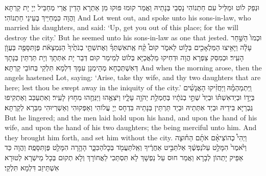 {וּנְפַק לוֹט וּמַלֵּיל עִם חַתְנוֹהִי נָסְבֵי בְּנָתֵיהּ וַאֲמַר קוּמוּ פּוּקוּ מִן אַתְרָא הָדֵין אֲרֵי מְחַבֵּיל יְיָ יָת קַרְתָּא וַהֲוָה כִּמְחַיֵּיךְ בְּעֵינֵי חַתְנוֹהִי׃}
{And Lot went out, and spoke unto his sons-in-law, who married his daughters, and said: ‘Up, get you out of this place; for the \lord\space will destroy the city.’ But he seemed unto his sons-in-law as one that jested.}{}
{וּכְמוֹ֙ הַשַּׁ֣חַר עָלָ֔ה וַיָּאִ֥יצוּ הַמַּלְאָכִ֖ים בְּל֣וֹט לֵאמֹ֑ר קוּם֩ קַ֨ח אֶֽת\maqqaf אִשְׁתְּךָ֜ וְאֶת\maqqaf שְׁתֵּ֤י בְנֹתֶ֙יךָ֙ הַנִּמְצָאֹ֔ת פֶּן\maqqaf תִּסָּפֶ֖ה בַּעֲוֺ֥ן הָעִֽיר׃}
{וּכְמִסַּק צַפְרָא הֲוָה וּדְחִיקוּ מַלְאֲכַיָּא בְּלוֹט לְמֵימַר קוּם דְּבַר יָת אִתְּתָךְ וְיָת תַּרְתֵּין בְּנָתָךְ דְּאִשְׁתְּכַחָא מְהֵימְנָן עִמָּךְ דִּלְמָא תִּלְקֵי בְּחוֹבֵי קַרְתָּא׃}
{And when the morning arose, then the angels hastened Lot, saying: ‘Arise, take thy wife, and thy two daughters that are here; lest thou be swept away in the iniquity of the city.’}{}
{וַֽיִּתְמַהְמָ֓הּ \legarmeh  וַיַּחֲזִ֨יקוּ הָאֲנָשִׁ֜ים בְּיָד֣וֹ וּבְיַד\maqqaf אִשְׁתּ֗וֹ וּבְיַד֙ שְׁתֵּ֣י בְנֹתָ֔יו בְּחֶמְלַ֥ת יְהֹוָ֖ה עָלָ֑יו וַיֹּצִאֻ֥הוּ וַיַּנִּחֻ֖הוּ מִח֥וּץ לָעִֽיר׃}
{וְאִתְעַכַּב וְאַתְקִיפוּ גֻּבְרַיָּא בִּידֵיהּ וּבְיַד אִתְּתֵיהּ וּבְיַד תַּרְתֵּין בְּנָתֵיהּ בִּדְחָס יְיָ עֲלוֹהִי וְאַפְּקוּהִי וְאַשְׁרְיוּהִי מִבַּרָא לְקַרְתָּא׃}
{But he lingered; and the men laid hold upon his hand, and upon the hand of his wife, and upon the hand of his two daughters; the \lord\space being merciful unto him. And they brought him forth, and set him without the city.}{}
{וַיְהִי֩ כְהוֹצִיאָ֨ם אֹתָ֜ם הַח֗וּצָה וַיֹּ֙אמֶר֙ הִמָּלֵ֣ט עַל\maqqaf נַפְשֶׁ֔ךָ אַל\maqqaf תַּבִּ֣יט אַחֲרֶ֔יךָ וְאַֽל\maqqaf תַּעֲמֹ֖ד בְּכׇל\maqqaf הַכִּכָּ֑ר הָהָ֥רָה הִמָּלֵ֖ט פֶּן\maqqaf תִּסָּפֶֽה׃}
{וַהֲוָה כַּד אַפֵּיק יָתְהוֹן לְבָרָא וַאֲמַר חוּס עַל נַפְשָׁךְ לָא תִּסְתַּכִי לַאֲחוֹרָךְ וְלָא תְקוּם בְּכָל מֵישְׁרָא לְטוּרָא אִשְׁתֵּיזַב דִּלְמָא תִּלְקֵי׃}

